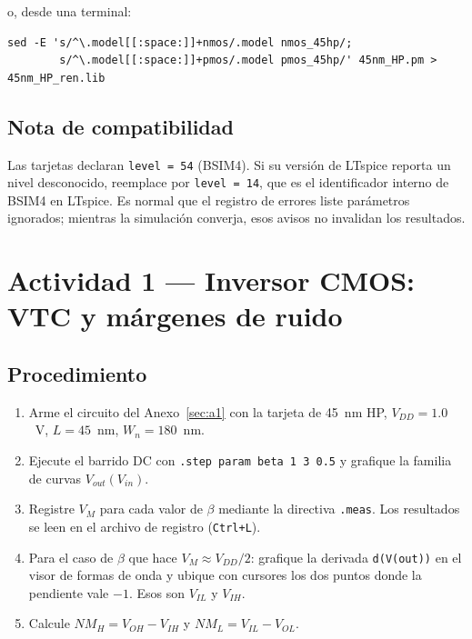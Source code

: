 \documentclass[11pt,a4paper]{article}
\begin{document}
\noindent o, desde una terminal:

\begin{lstlisting}[language={}]
sed -E 's/^\.model[[:space:]]+nmos/.model nmos_45hp/;
        s/^\.model[[:space:]]+pmos/.model pmos_45hp/' 45nm_HP.pm > 45nm_HP_ren.lib
\end{lstlisting}

\subsection{Nota de compatibilidad}

Las tarjetas declaran \texttt{level = 54} (BSIM4). Si su versión de LTspice reporta un nivel desconocido, reemplace por \texttt{level = 14}, que es el identificador interno de BSIM4 en LTspice. Es normal que el registro de errores liste parámetros ignorados; mientras la simulación converja, esos avisos no invalidan los resultados.

\section{Actividad 1 --- Inversor CMOS: VTC y márgenes de ruido}

\subsection*{Procedimiento}
\begin{enumerate}[leftmargin=1.6em,itemsep=0.35em]
  \item Arme el circuito del Anexo~\ref{sec:a1} con la tarjeta de 45~nm HP, $V_{DD}=1.0$~V, $L=45$~nm, $W_n=180$~nm.
  \item Ejecute el barrido DC con \lstinline|.step param beta 1 3 0.5| y grafique la familia de curvas $V_{out}(V_{in})$.
  \item Registre $V_M$ para cada valor de $\beta$ mediante la directiva \lstinline|.meas|. Los resultados se leen en el archivo de registro (\texttt{Ctrl+L}).
  \item Para el caso de $\beta$ que hace $V_M \approx V_{DD}/2$: grafique la derivada \lstinline|d(V(out))| en el visor de formas de onda y ubique con cursores los dos puntos donde la pendiente vale $-1$. Esos son $V_{IL}$ y $V_{IH}$.
  \item Calcule $NM_H = V_{OH}-V_{IH}$ y $NM_L = V_{IL}-V_{OL}$.
\end{enumerate}
\end{document}
